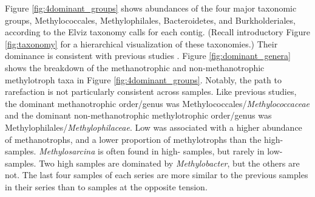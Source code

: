 Figure \ref{fig:4dominant_groups} shows abundances of the four major taxonomic groups, Methylococcales, Methylophilales, Bacteroidetes, and Burkholderiales, according to the Elviz taxonomy calls for each contig. %
(Recall introductory Figure \ref{fig:taxonomy} for a hierarchical visualization of these taxonomies.)
Their dominance is consistent with previous studies \cite{beck2013LW, beck2014LW, oshkin2015LW, hernandez2015LW, kalyuzhnaya2008Burkholderiales}.
Figure \ref{fig:dominant_genera} shows the breakdown of the methanotrophic and non-methanotrophic methylotroph taxa in Figure \ref{fig:4dominant_groups}.
Notably, the path to rarefaction is not particularly consistent across samples.
Like previous studies, the dominant methanotrophic order/genus was Methylococcales/\textit{Methylococcaceae} and the dominant non-methanotrophic methylotrophic order/genus was Methylophilales/\textit{Methylophilaceae}.
Low  was associated with a higher abundance of methanotrophs, and a lower proportion of methylotrophs than the high- samples.
\textit{Methylosarcina} is often found in high- samples, but rarely in low- samples.
Two high  samples are dominated by \textit{Methylobacter}, but the others are not.
The last four samples of each series are more similar to the previous samples in their series than to samples at the opposite  tension.


